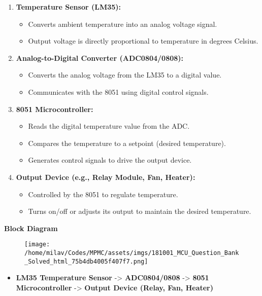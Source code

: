 \documentclass[
]{article}
\begin{document}
\begin{enumerate}
\def\labelenumi{\arabic{enumi}.}
\item
  \textbf{Temperature Sensor (LM35):}

  \begin{itemize}
  \item
    Converts ambient temperature into an analog voltage signal.
  \item
    Output voltage is directly proportional to temperature in degrees
    Celsius.
  \end{itemize}
\item
  \textbf{Analog-to-Digital Converter (ADC0804/0808):}

  \begin{itemize}
  \item
    Converts the analog voltage from the LM35 to a digital value.
  \item
    Communicates with the 8051 using digital control signals.
  \end{itemize}
\item
  \textbf{8051 Microcontroller:}

  \begin{itemize}
  \item
    Reads the digital temperature value from the ADC.
  \item
    Compares the temperature to a setpoint (desired temperature).
  \item
    Generates control signals to drive the output device.
  \end{itemize}
\item
  \textbf{Output Device (e.g., Relay Module, Fan, Heater):}

  \begin{itemize}
  \item
    Controlled by the 8051 to regulate temperature.
  \item
    Turns on/off or adjusts its output to maintain the desired
    temperature.
  \end{itemize}
\end{enumerate}

\textbf{Block Diagram}

\begin{figure}
\centering
\texttt{[image: /home/milav/Codes/MPMC/assets/imgs/181001\_MCU\_Question\_Bank\_Solved\_html\_75b4db4005f407f7.png]}
\caption{}
\end{figure}

\begin{itemize}
\item
  \textbf{LM35 Temperature Sensor} -\textgreater{} \textbf{ADC0804/0808}
  -\textgreater{} \textbf{8051 Microcontroller} -\textgreater{}
  \textbf{Output Device (Relay, Fan, Heater)}
\end{itemize}
\end{document}
